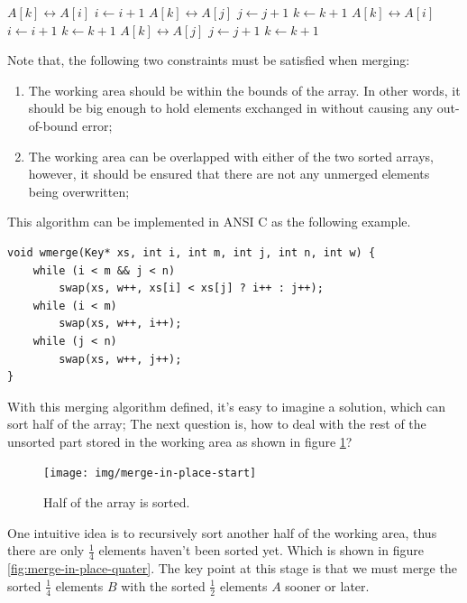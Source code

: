 \documentclass[b5paper]{article}
\begin{document}
\begin{algorithmic}[1]
\Procedure{Merge}{$A, [i, m), [j, n), k$}
      \State {} $A[k] \leftrightarrow A[i]$
      \State $i \gets i + 1$
    \Else
      \State {} $A[k] \leftrightarrow A[j]$
      \State $j \gets j + 1$
    \EndIf
    \State $k \gets k + 1$
  \EndWhile
    \State {} $A[k] \leftrightarrow A[i]$
    \State $i \gets i + 1$
    \State $k \gets k + 1$
  \EndWhile
    \State {} $A[k] \leftrightarrow A[j]$
    \State $j \gets j + 1$
    \State $k \gets k + 1$
  \EndWhile
\EndProcedure
\end{algorithmic}

Note that, the following two constraints must be satisfied when merging:

\begin{enumerate}
\item The working area should be within the bounds of the array. In other words, it should be big
enough to hold elements exchanged in without causing any out-of-bound error;
\item The working area can be overlapped with either of the two sorted arrays, however, it should
be ensured that there are not any unmerged elements being overwritten;
\end{enumerate}

This algorithm can be implemented in ANSI C as the following example.

\lstset{language=C}
\begin{lstlisting}
void wmerge(Key* xs, int i, int m, int j, int n, int w) {
    while (i < m && j < n)
        swap(xs, w++, xs[i] < xs[j] ? i++ : j++);
    while (i < m)
        swap(xs, w++, i++);
    while (j < n)
        swap(xs, w++, j++);
}
\end{lstlisting}

With this merging algorithm defined, it's easy to imagine a solution, which can sort
half of the array; The next question is, how to deal with the rest of the unsorted part
stored in the working area as shown in figure \ref{fig:merge-in-place-start}?

\begin{figure}[htbp]
 \centering
 \texttt{[image: img/merge-in-place-start]}
 \caption{Half of the array is sorted.}
 \label{fig:merge-in-place-start}
\end{figure}

One intuitive idea is to recursively sort another half of the working area, thus there are
only $\frac{1}{4}$ elements haven't been sorted yet. Which is shown in figure \ref{fig:merge-in-place-quater}.
The key point at this stage is that we must merge the sorted $\frac{1}{4}$ elements $B$
with the sorted $\frac{1}{2}$ elements $A$ sooner or later.
\end{document}
